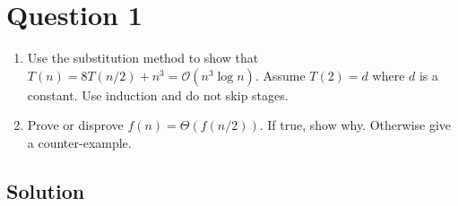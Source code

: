 
\section*{Question 1}

\begin{enumerate}[label=(\alph*)]
\item Use the substitution method to show that $T(n) = 8T(n/2) + n^3 = \mathcal{O}(n^3\log n)$. Assume $T(2)=d$ where $d$ is a constant. Use induction and do not skip stages.

\item Prove or disprove $f(n) = \Theta(f(n/2))$. If true, show why. Otherwise give a counter-example.
\end{enumerate}

\subsection*{Solution}

